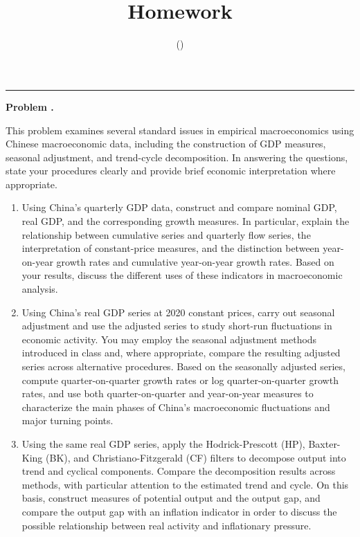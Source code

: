 \documentclass[11pt]{article}
\title{\vspace{-1.5em}\textbf{\course} \\ \large Homework \hwno}
\author{\name \quad (\studentid) \\ \due}
\date{}
\newcounter{problem}
\newenvironment{problem}[1][]{
	\refstepcounter{problem}
	\vspace{0.75em}
	\noindent\textbf{Problem \theproblem.} \textit{#1}\par
	\vspace{0.25em}
}{\vspace{0.5em}}
\begin{document}
	\maketitle
	\vspace{-1em}
	\hrule
	\vspace{1em}
	\begin{problem}
		This problem examines several standard issues in empirical macroeconomics using Chinese macroeconomic data, including the construction of GDP measures, seasonal adjustment, and trend-cycle decomposition. In answering the questions, state your procedures clearly and provide brief economic interpretation where appropriate.
		
		\begin{enumerate}[label=(\alph*)]
			\item Using China’s quarterly GDP data, construct and compare nominal GDP, real GDP, and the corresponding growth measures. In particular, explain the relationship between cumulative series and quarterly flow series, the interpretation of constant-price measures, and the distinction between year-on-year growth rates and cumulative year-on-year growth rates. Based on your results, discuss the different uses of these indicators in macroeconomic analysis.
			
			\item Using China’s real GDP series at 2020 constant prices, carry out seasonal adjustment and use the adjusted series to study short-run fluctuations in economic activity. You may employ the seasonal adjustment methods introduced in class and, where appropriate, compare the resulting adjusted series across alternative procedures. Based on the seasonally adjusted series, compute quarter-on-quarter growth rates or log quarter-on-quarter growth rates, and use both quarter-on-quarter and year-on-year measures to characterize the main phases of China’s macroeconomic fluctuations and major turning points.
			
			\item Using the same real GDP series, apply the Hodrick-Prescott (HP), Baxter-King (BK), and Christiano-Fitzgerald (CF) filters to decompose output into trend and cyclical components. Compare the decomposition results across methods, with particular attention to the estimated trend and cycle. On this basis, construct measures of potential output and the output gap, and compare the output gap with an inflation indicator in order to discuss the possible relationship between real activity and inflationary pressure.
		\end{enumerate}
	\end{problem}
	
\end{document}
